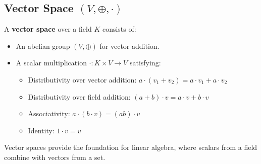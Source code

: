 \subsection{Vector Space \((V, \oplus, \cdot)\)}
A \textbf{vector space} over a field \(K\) consists of:
\begin{itemize}[label=\(-\)]
  \item An abelian group \((V, \oplus)\) for vector addition.
  \item A scalar multiplication \(\cdot: K \times V \to V\) satisfying:
  \begin{itemize}
    \item Distributivity over vector addition: \(a \cdot (v_1 + v_2) = a \cdot v_1 + a \cdot v_2\)
    \item Distributivity over field addition: \((a + b) \cdot v = a \cdot v + b \cdot v\)
    \item Associativity: \(a \cdot (b \cdot v) = (ab) \cdot v\)
    \item Identity: \(1 \cdot v = v\)
  \end{itemize}
\end{itemize}
Vector spaces provide the foundation for linear algebra, where scalars from a field combine with vectors from a set.

\newpage
